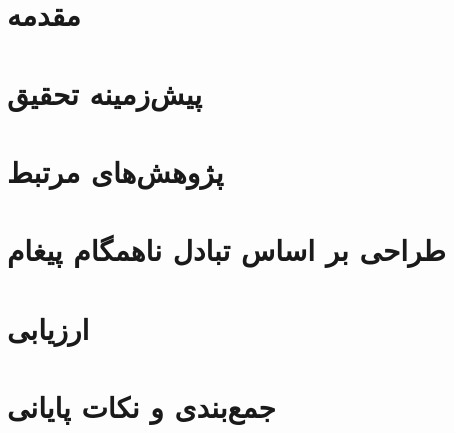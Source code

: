 \documentclass[oneside, a4paper,11pt]{book}
\numberwithin{equation}{chapter}
\numberwithin{table}{chapter}
\numberwithin{figure}{chapter}
\numberwithin{equation}{chapter}
\begin{document}
\setcounter{page}{1}
\setcounter{secnumdepth}{3}
\chapter{مقدمه}
\label{chapter:Introduction}
\thispagestyle{plain}

\chapter{پیش‌زمینه تحقیق}
\label{chapter:Preliminaries}
\thispagestyle{plain}

\chapter{پژوهش‌های مرتبط}
\label{chapter:RelatedWork}
\thispagestyle{plain}

\chapter{طراحی بر اساس تبادل ناهمگام پیغام}
\label{chapter:proposedFramework}
\thispagestyle{plain}

\chapter{ارزیابی}
\label{chapter:evaluation}
\thispagestyle{plain}

\chapter{جمع‌بندی و نکات پایانی}
\label{chapter:Conclusion}
\thispagestyle{plain}


%
\newpage

\linespread{1.2}

\small{

\clearpage
{}
{}

}

\newpage
\begin{multicols}{2}
\def\glossaryname{واژه‌نامه‌ی فارسی به انگلیسی}
\printglossary
{}
\end{multicols}
\end{document}
